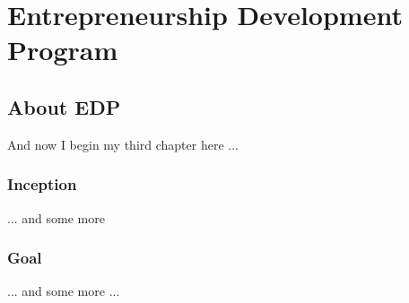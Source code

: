 \chapter{Entrepreneurship Development Program}
\ifpdf
    \graphicspath{{Chapter3/Chapter3Figs/PNG/}{Chapter3/Chapter3Figs/PDF/}{Chapter3/Chapter3Figs/}}
\else
    \graphicspath{{Chapter3/Chapter3Figs/EPS/}{Chapter3/Chapter3Figs/}}
\fi

\section{About EDP}
And now I begin my third chapter here ...

\subsection{Inception}
... and some more 

\subsection{Goal}
... and some more ...





